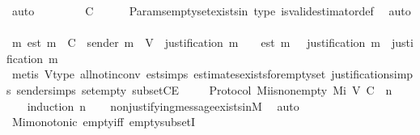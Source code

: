 \begin{isabellebody}
%
\isatagproof
{}\isamarkupfalse%
\ auto\isanewline
{}\isamarkupfalse%
\ {\isacharminus}\isanewline
\ \ \isamarkupfalse%
\ {\isachardoublequoteopen}{\isasymepsilon}\ {\isasymemptyset}\ {\isasymsubseteq}\ C{\isachardoublequoteclose}\isanewline
\ \ \ \ \isamarkupfalse%
\ Params{\isachardot}empty{\isacharunderscore}set{\isacharunderscore}exists{\isacharunderscore}in{\isacharunderscore}{\isasymSigma}\ {\isasymepsilon}{\isacharunderscore}type\ is{\isacharunderscore}valid{\isacharunderscore}estimator{\isacharunderscore}def\ \isamarkupfalse%
\ auto\isanewline
\ \ \isamarkupfalse%
\ \isamarkupfalse%
\ {\isachardoublequoteopen}{\isasymexists}m{\isachardot}\ est\ m\ {\isasymin}\ C\ {\isasymand}\ sender\ m\ {\isasymin}\ V\ {\isasymand}\ justification\ m\ {\isacharequal}\ {\isasymemptyset}\ {\isasymand}\ est\ m\ {\isasymin}\ {\isasymepsilon}\ {\isacharparenleft}justification\ m{\isacharparenright}\ {\isasymand}\ justification\ m\ {\isacharequal}\ {\isasymemptyset}{\isachardoublequoteclose}\isanewline
\ \ \ \ \isamarkupfalse%
\ {\isacharparenleft}metis\ V{\isacharunderscore}type\ all{\isacharunderscore}not{\isacharunderscore}in{\isacharunderscore}conv\ est{\isachardot}simps\ estimates{\isacharunderscore}exists{\isacharunderscore}for{\isacharunderscore}empty{\isacharunderscore}set\ justification{\isachardot}simps\ sender{\isachardot}simps\ set{\isacharunderscore}empty\ subsetCE{\isacharparenright}\isanewline
{}\isamarkupfalse%
%
\endisatagproof
{\isafoldproof}%
%
\isadelimproof
\ \ \isanewline
%
\endisadelimproof
\isanewline
{}\isamarkupfalse%
\ {\isacharparenleft}\ Protocol{\isacharparenright}\ M{\isacharunderscore}i{\isacharunderscore}is{\isacharunderscore}non{\isacharunderscore}empty{\isacharcolon}\ {\isachardoublequoteopen}M{\isacharunderscore}i\ {\isacharparenleft}V{\isacharcomma}\ C{\isacharcomma}\ {\isasymepsilon}{\isacharparenright}\ n\ {\isasymnoteq}\ {\isasymemptyset}{\isachardoublequoteclose}\isanewline
%
\isadelimproof
\ \ %
\endisadelimproof
%
\isatagproof
{}\isamarkupfalse%
\ {\isacharparenleft}induction\ n{\isacharparenright}\isanewline
\ \ \isamarkupfalse%
\ non{\isacharunderscore}justifying{\isacharunderscore}message{\isacharunderscore}exists{\isacharunderscore}in{\isacharunderscore}M{\isacharunderscore}{}\ \isamarkupfalse%
\ auto\isanewline
\ \ \isamarkupfalse%
\ Mi{\isacharunderscore}monotonic\ empty{\isacharunderscore}iff\ empty{\isacharunderscore}subsetI\ \isamarkupfalse%

\end{isabellebody}
